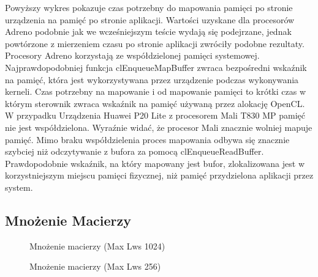 Powyższy wykres pokazuje czas potrzebny do mapowania pamięci po stronie urządzenia na pamięć po stronie aplikacji. Wartości uzyskane dla procesorów Adreno podobnie jak we wcześniejszym teście wydają się podejrzane, jednak powtórzone z mierzeniem czasu po stronie aplikacji zwróciły podobne rezultaty. Procesory Adreno korzystają ze współdzielonej pamięci systemowej. Najprawdopodobniej  funkcja clEnqueueMapBuffer zwraca bezpośredni wskaźnik na pamięć, która jest wykorzystywana przez urządzenie podczas wykonywania kerneli. Czas potrzebny na mapowanie i od mapowanie pamięci to krótki czas w którym sterownik zwraca wskaźnik na pamięć używaną przez alokację OpenCL. W przypadku Urządzenia Huawei P20 Lite z procesorem Mali T830 MP pamięć nie jest współdzielona. Wyraźnie widać, że procesor Mali znacznie wolniej mapuje pamięć. Mimo braku współdzielenia proces mapowania odbywa się znacznie szybciej niż odczytywanie z bufora za pomocą clEnqueueReadBuffer. Prawdopodobnie wskaźnik, na który mapowany jest bufor, zlokalizowana jest w korzystniejszym miejscu pamięci fizycznej, niż pamięć przydzielona aplikacji przez system.

\subsection[Mnożenie Macierzy]{Mnożenie Macierzy}
\begin{figure}[H]
\caption{Mnożenie macierzy (Max Lws 1024)}
\end{figure}

\begin{figure}[H]
\caption{Mnożenie macierzy (Max Lws 256)}
\end{figure}

